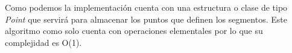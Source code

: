 Como podemos la implementación cuenta con una estructura o clase de tipo {\em Point}  que servirá para almacenar los puntos que definen los segmentos. Este algoritmo como solo cuenta con operaciones elementales por lo que su complejidad es O(1).
